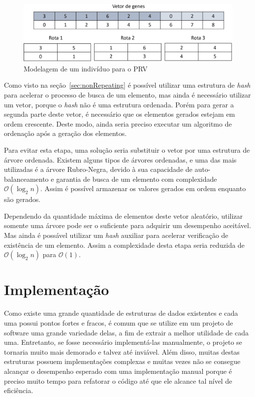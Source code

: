 \documentclass[12pt]{article}
\begin{document}
\begin{figure}[ht]
    \centering
    \includegraphics[width=.8\textwidth]{vrp_genes.jpg}
    \caption{Modelagem de um indiv\'{i}duo para o PRV}
    \label{fig:vrpGenes}
\end{figure}

Como visto na se\c{c}\~{a}o~\ref{sec:nonRepeating} \'{e} poss\'{i}vel utilizar uma estrutura de \textit{hash} para
acelerar o processo de busca de um elemento, mas ainda \'{e} necess\'{a}rio utilizar um vetor, porque o
\textit{hash} n\~{a}o \'{e} uma estrutura ordenada. Por\'{e}m para gerar a segunda parte deste vetor, \'{e} necess\'{a}rio que
os elementos gerados estejam em ordem crescente. Deste modo, ainda seria preciso executar um
algoritmo de ordena\c{c}\~{a}o ap\'{o}s a gera\c{c}\~{a}o dos elementos.

Para evitar esta etapa, uma solu\c{c}\~{a}o seria substituir o vetor por uma estrutura de \'{a}rvore ordenada. Existem
alguns tipos de \'{a}rvores ordenadas, e uma das mais utilizadas \'{e} a \'{a}rvore Rubro-Negra, devido \`{a} sua
capacidade de auto-balanceamento e garantia de busca de um elemento com complexidade $\mathcal{O}(\log_2n)$.
Assim \'{e} poss\'{i}vel armazenar os valores gerados em ordem enquanto s\~{a}o gerados.

Dependendo da quantidade m\'{a}xima de elementos deste vetor aleat\'{o}rio, utilizar somente uma \'{a}rvore pode
ser o suficiente para adquirir um desempenho aceit\'{a}vel. Mas ainda \'{e} poss\'{a}vel utilizar um \textit{hash}
auxiliar para acelerar verifica\c{c}\~{a}o de exist\^{e}ncia de um elemento. Assim a complexidade desta etapa seria
reduzida de $\mathcal{O}(\log_2n)$ para $\mathcal{O}(1)$.

\section{Implementa\c{c}\~{a}o}

Como existe uma grande quantidade de estruturas de dados existentes e cada uma possui pontos fortes e fracos,
\'{e} comum que se utilize em um projeto de software uma grande variedade delas, a fim de extrair a melhor utilidade
de cada uma. Entretanto, se fosse necess\'{a}rio implement\'{a}-las manualmente, o projeto se tornaria muito mais
demorado e talvez at\'{e} invi\'{a}vel. Al\'{e}m disso, muitas destas estruturas possuem implementa\c{c}\~{o}es
complexas e muitas vezes n\~{a}o se consegue alcan\c{c}ar o desempenho esperado com uma implementa\c{c}\~{a}o manual
porque \'{e} preciso muito tempo para refatorar o c\'{o}digo at\'{e} que ele alcance tal n\'{i}vel de efici\^{e}ncia.
\end{document}
